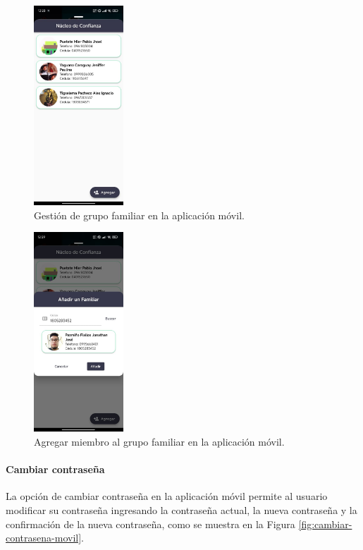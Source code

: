 \begin{figure}[H]
    \centering
    \includegraphics[width=0.3\textwidth]{chapters/III-resultados-y-discusion/resources/images/grupo-familiar-movil.png}
    \caption{Gestión de grupo familiar en la aplicación móvil.}
    \label{fig:grupo-familiar-movil}
\end{figure}

\begin{figure}[H]
    \centering
    \includegraphics[width=0.3\textwidth]{chapters/III-resultados-y-discusion/resources/images/agregar-miembro-movil.png}
    \caption{Agregar miembro al grupo familiar en la aplicación móvil.}
    \label{fig:agregar-miembro-movil}
\end{figure}

\paragraph{Cambiar contraseña}
La opción de cambiar contraseña en la aplicación móvil permite al usuario modificar su contraseña ingresando la contraseña actual,
la nueva contraseña y la confirmación de la nueva contraseña, como se muestra en la Figura \ref{fig:cambiar-contrasena-movil}.

